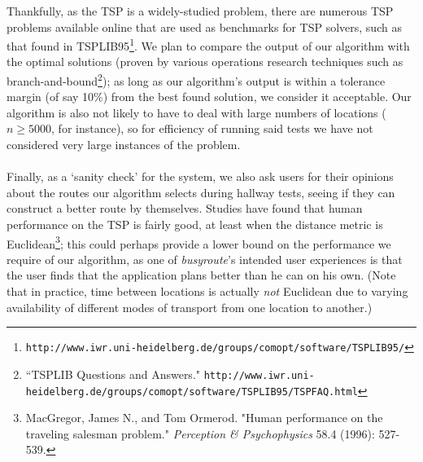 \documentclass[a4paper, 10pt]{article}
\begin{document}
Thankfully, as the TSP is a widely-studied problem, there are numerous TSP problems available online that are used as benchmarks for TSP solvers, such as that found in TSPLIB95\footnote{\texttt{http://www.iwr.uni-heidelberg.de/groups/comopt/software/TSPLIB95/}}. We plan to compare the output of our algorithm with the optimal solutions (proven by various operations research techniques such as branch-and-bound\footnote{``TSPLIB Questions and Answers." \texttt{http://www.iwr.uni-heidelberg.de/groups/comopt/software/TSPLIB95/TSPFAQ.html}}); as long as our algorithm's output is within a tolerance margin (of say 10\%) from the best found solution, we consider it acceptable. Our algorithm is also not likely to have to deal with large numbers of locations ($n \geq 5000$, for instance), so for efficiency of running said tests we have not considered very large instances of the problem. \\\\
Finally, as a `sanity check' for the system, we also ask users for their opinions about the routes our algorithm selects during hallway tests, seeing if they can construct a better route by themselves. Studies have found that human performance on the TSP is fairly good, at least when the distance metric is Euclidean\footnote{MacGregor, James N., and Tom Ormerod. "Human performance on the traveling salesman problem." \textit{Perception \& Psychophysics} 58.4 (1996): 527-539.}; this could perhaps provide a lower bound on the performance we require of our algorithm, as one of \textit{busyroute}'s intended user experiences is that the user finds that the application plans better than he can on his own. (Note that in practice, time between locations is actually \textit{not} Euclidean due to varying availability of different modes of transport from one location to another.)
\end{document}
